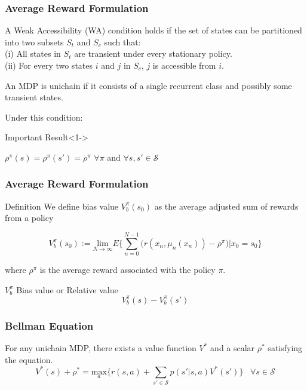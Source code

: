 \documentclass{beamer}
\begin{document}
\begin{frame}
\frametitle{Average Reward Formulation}
\begin{definition}
A Weak Accessibility (WA) condition holds if the set of states can be partitioned into two subsets $S_t$ and $S_c$ such that:\\
(i) All states in $S_t$ are transient under every stationary policy.\\
(ii) For every two states $i$ and $j$ in $S_c$, $j$ is accessible from $i$.
\end{definition}
\begin{definition}
\label{def:unichain}
An MDP is unichain if it consists of a single recurrent class and possibly some transient states.
\end{definition}
Under this condition:
\begin{block}{Important Result}<1->
\begin{center}
    $\rho^{\pi}(s) = \rho^{\pi}(s') = \rho^\pi$ $\forall \pi$ and $\forall s,s' \in \mathcal{S}$
\end{center}
\end{block}
\end{frame}

\begin{frame}
\frametitle{Average Reward Formulation}
\begin{block}{Definition}
We define bias value  $V_b^\pi(s_0)$ as the average adjusted sum of rewards from a policy

   \[ V_b^\pi(s_0) := \underset{N\rightarrow\infty}{\text{lim}} E\Big\{\sum_{n=0}^{N-1}\Big(r(x_n,\mu_n(x_n))-\rho^\pi\Big)|x_0=s_0\Big\}\]

where $\rho^\pi$ is the average reward associated with the policy $\pi$.\\
\end{block}
$V_b^\pi$ Bias value or Relative value
\[V_b^\pi(s)-V_b^\pi(s')\]
\end{frame}

\begin{frame}
\frametitle{Bellman Equation}
\begin{theorem}
For any unichain MDP, there exists a value function $V^*$ and a scalar $\rho^*$ satisfying the equation.
\[
    V^*(s)+\rho^* = \underset{a}{\text{max}}\Big\{r(s,a)+ \sum_{s'\in\mathcal{S}}p(s'|s,a)V^*(s')\Big\}  \hspace{10pt} \forall s \in \mathcal{S}\]

\end{theorem}
\end{frame}
\end{document}
